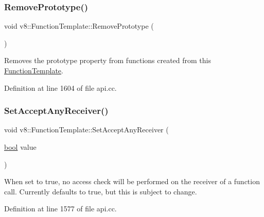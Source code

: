 \mbox{\label{classv8_1_1FunctionTemplate_a4a184aca244174c7fe52d58871d3129e}} 
\subsubsection{\texorpdfstring{Remove\+Prototype()}{RemovePrototype()}}
{\footnotesize\ttfamily void v8\+::\+Function\+Template\+::\+Remove\+Prototype (\begin{DoxyParamCaption}{ }\end{DoxyParamCaption})}

Removes the prototype property from functions created from this \mbox{\hyperlink{classv8_1_1FunctionTemplate}{Function\+Template}}. 

Definition at line 1604 of file api.\+cc.

\mbox{\label{classv8_1_1FunctionTemplate_a5ffdc68d8035b02ed7583950b76ef91f}} 
\subsubsection{\texorpdfstring{Set\+Accept\+Any\+Receiver()}{SetAcceptAnyReceiver()}}
{\footnotesize\ttfamily void v8\+::\+Function\+Template\+::\+Set\+Accept\+Any\+Receiver (\begin{DoxyParamCaption}\item[{\mbox{\hyperlink{classbool}{bool}}}]{value }\end{DoxyParamCaption})}

When set to true, no access check will be performed on the receiver of a function call. Currently defaults to true, but this is subject to change. 

Definition at line 1577 of file api.\+cc.

\mbox{\label{classv8_1_1FunctionTemplate_ab7b6e9d60595d4cfd6e1a6b59e625830}} 
